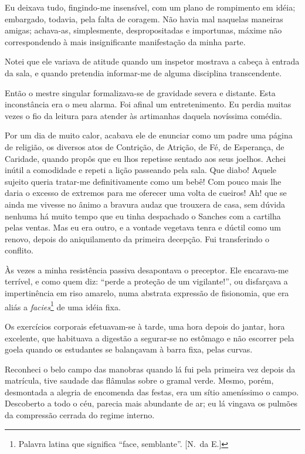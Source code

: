 Eu deixava tudo, fingindo{}-me insensível, com um plano de rompimento em idéia;
embargado, todavia, pela falta de coragem. Não havia mal naquelas
maneiras amigas; achava{}-as, simplesmente, despropositadas e
importunas, máxime não correspondendo à mais insignificante
manifestação da minha parte. 

Notei que ele variava de atitude quando um
inspetor mostrava a cabeça à entrada da sala, e quando pretendia
informar{}-me de alguma disciplina transcendente. 

Então o mestre singular formalizava{}-se de gravidade severa e distante. 
Esta inconstância era o meu alarma. Foi afinal um entretenimento. Eu perdia
muitas vezes o fio da leitura para atender às artimanhas daquela
novíssima comédia. 

Por um dia de muito calor, acabava ele de enunciar
como um padre uma página de religião, os diversos atos de Contrição, de
Atrição, de Fé, de Esperança, de Caridade, quando propôs que eu lhos
repetisse sentado aos seus joelhos. Achei inútil a comodidade e repeti
a lição passeando pela sala. Que diabo! Aquele sujeito queria
tratar{}-me definitivamente como um bebê! Com pouco mais lhe daria o
excesso de extremos para me oferecer uma volta de cueiros! Ah! que se
ainda me vivesse no ânimo a bravura audaz que trouxera de casa, sem
dúvida nenhuma há muito tempo que eu tinha despachado o Sanches com a
cartilha pelas ventas. Mas eu era outro, e a vontade vegetava tenra e
dúctil como um renovo, depois do aniquilamento da primeira decepção.
Fui transferindo o conflito. 

Às vezes a minha resistência passiva
desapontava o preceptor. Ele encarava{}-me terrível, e como quem diz:
``perde a proteção de um vigilante!'', ou disfarçava a impertinência em
riso amarelo, numa abstrata expressão de fisionomia, que era aliás a 
\textit{facies}\footnote{ Palavra latina que significa ``face, semblante''.  
[N.~da E.]} de uma idéia fixa. 

Os exercícios corporais efetuavam{}-se à tarde, uma hora depois
do jantar, hora excelente, que habituava a digestão a segurar{}-se no
estômago e não escorrer pela goela quando os estudantes se balançavam à
barra fixa, pelas curvas. 

Reconheci o belo campo das manobras quando lá
fui pela primeira vez depois da matrícula, tive saudade das flâmulas
sobre o gramal verde. Mesmo, porém, desmontada a alegria de encomenda
das festas, era um sítio ameníssimo o campo. Descoberto a todo o céu,
parecia mais abundante de ar; eu lá vingava os pulmões da compressão
cerrada do regime interno. 

